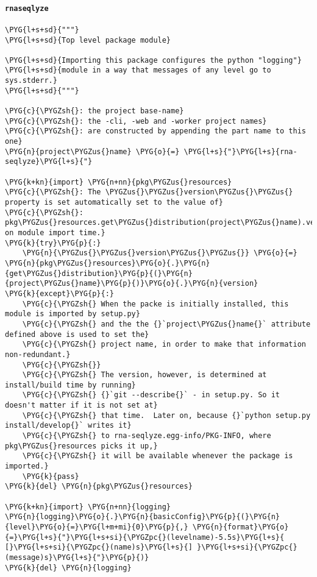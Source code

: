 \paragraph{\texttt{rnaseqlyze}}
\label{index-pdf4:id3}
\begin{Verbatim}[commandchars=\\\{\}]
\PYG{l+s+sd}{"""}
\PYG{l+s+sd}{Top level package module}

\PYG{l+s+sd}{Importing this package configures the python "logging"}
\PYG{l+s+sd}{module in a way that messages of any level go to sys.stderr.}
\PYG{l+s+sd}{"""}

\PYG{c}{\PYGZsh{}: the project base-name}
\PYG{c}{\PYGZsh{}: the -cli, -web and -worker project names}
\PYG{c}{\PYGZsh{}: are constructed by appending the part name to this one}
\PYG{n}{project\PYGZus{}name} \PYG{o}{=} \PYG{l+s}{"}\PYG{l+s}{rna-seqlyze}\PYG{l+s}{"}

\PYG{k+kn}{import} \PYG{n+nn}{pkg\PYGZus{}resources}
\PYG{c}{\PYGZsh{}: The \PYGZus{}\PYGZus{}version\PYGZus{}\PYGZus{} property is set automatically set to the value of}
\PYG{c}{\PYGZsh{}: pkg\PYGZus{}resources.get\PYGZus{}distribution(project\PYGZus{}name).version on module import time.}
\PYG{k}{try}\PYG{p}{:}
    \PYG{n}{\PYGZus{}\PYGZus{}version\PYGZus{}\PYGZus{}} \PYG{o}{=} \PYG{n}{pkg\PYGZus{}resources}\PYG{o}{.}\PYG{n}{get\PYGZus{}distribution}\PYG{p}{(}\PYG{n}{project\PYGZus{}name}\PYG{p}{)}\PYG{o}{.}\PYG{n}{version}
\PYG{k}{except}\PYG{p}{:}
    \PYG{c}{\PYGZsh{} When the packe is initially installed, this module is imported by setup.py}
    \PYG{c}{\PYGZsh{} and the the {}`project\PYGZus{}name{}` attribute defined above is used to set the}
    \PYG{c}{\PYGZsh{} project name, in order to make that information non-redundant.}
    \PYG{c}{\PYGZsh{}}
    \PYG{c}{\PYGZsh{} The version, however, is determined at install/build time by running}
    \PYG{c}{\PYGZsh{} {}`git --describe{}` - in setup.py. So it doesn't matter if it is not set at}
    \PYG{c}{\PYGZsh{} that time.  Later on, because {}`python setup.py install/develop{}` writes it}
    \PYG{c}{\PYGZsh{} to rna-seqlyze.egg-info/PKG-INFO, where pkg\PYGZus{}resources picks it up,}
    \PYG{c}{\PYGZsh{} it will be available whenever the package is imported.}
    \PYG{k}{pass}
\PYG{k}{del} \PYG{n}{pkg\PYGZus{}resources}

\PYG{k+kn}{import} \PYG{n+nn}{logging}
\PYG{n}{logging}\PYG{o}{.}\PYG{n}{basicConfig}\PYG{p}{(}\PYG{n}{level}\PYG{o}{=}\PYG{l+m+mi}{0}\PYG{p}{,} \PYG{n}{format}\PYG{o}{=}\PYG{l+s}{"}\PYG{l+s+si}{\PYGZpc{}(levelname)-5.5s}\PYG{l+s}{ [}\PYG{l+s+si}{\PYGZpc{}(name)s}\PYG{l+s}{] }\PYG{l+s+si}{\PYGZpc{}(message)s}\PYG{l+s}{"}\PYG{p}{)}
\PYG{k}{del} \PYG{n}{logging}


\end{Verbatim}
